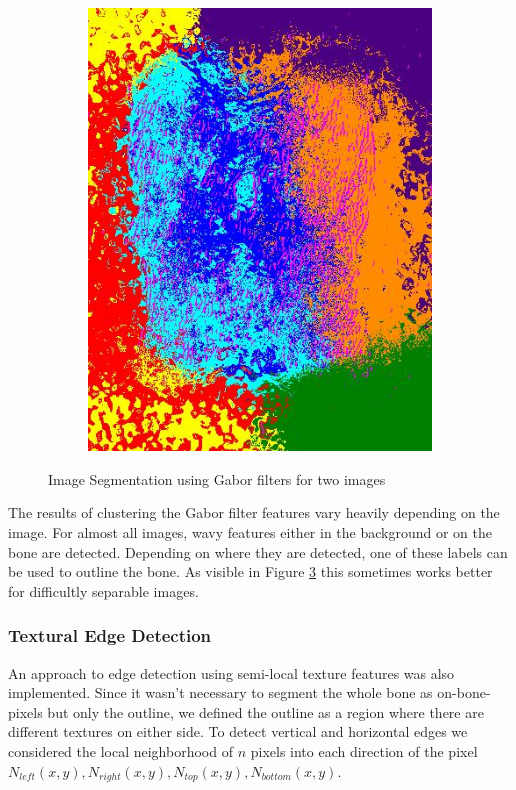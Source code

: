 \documentclass[pdftex,12pt,a4paper]{report}
\begin{document}
\begin{figure}[h]
\begin{subfigure}[b]{0.24\textwidth}
		\subcaption{}
		\label{fig:gabor:bad}
	\end{subfigure}
	\begin{subfigure}[b]{0.24\textwidth}
		\centering
		\includegraphics[width=.9\linewidth]{img/segmentation/bad/gabor/segmented.jpg}
		\subcaption*{}
		\label{}
	\end{subfigure}
	\caption{Image Segmentation using Gabor filters for two images}
	\label{fig:gabor}
\end{figure}

The results of clustering the Gabor filter features vary heavily depending on the image. For almost all images, wavy features either in the background or on the bone are detected. Depending on where they are detected, one of these labels can be used to outline the bone. As visible in Figure \ref{fig:gabor} this sometimes works better for difficultly separable images.

\subsubsection{Textural Edge Detection}

An approach to edge detection using semi-local texture features was also implemented. Since it wasn't necessary to segment the whole bone as on-bone-pixels but only the outline, we defined the outline as a region where there are different textures on either side. To detect vertical and horizontal edges we considered the local neighborhood of $n$ pixels into each direction of the pixel $N_{left}(x,y), N_{right}(x,y), N_{top}(x,y), N_{bottom}(x,y)$.
\end{document}

